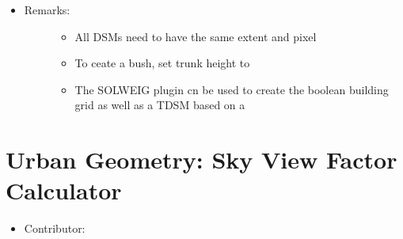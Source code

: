 \documentclass[letterpaper,10pt,english]{sphinxmanual}
\begin{document}
\begin{itemize}
\begin{description}
\begin{itemize}
\end{itemize}

\end{description}

\item {} \begin{description}
\item[{Remarks:}] \leavevmode\begin{itemize}
\item {} 
All DSMs need to have the same extent and pixel

\item {} 
To ceate a bush, set trunk height to

\item {} 
The SOLWEIG plugin cn be used to create the boolean building grid as well as a TDSM based on a

\end{itemize}

\end{description}

\end{itemize}


\section{Urban Geometry: Sky View Factor Calculator}
\label{\detokenize{pre-processor/Urban Geometry Sky View Factor Calculator:urban-geometry-sky-view-factor-calculator}}\label{\detokenize{pre-processor/Urban Geometry Sky View Factor Calculator:skyviewfactorcalculator}}\label{\detokenize{pre-processor/Urban Geometry Sky View Factor Calculator::doc}}\begin{itemize}
\item {} 
Contributor:

\end{itemize}
\end{document}
